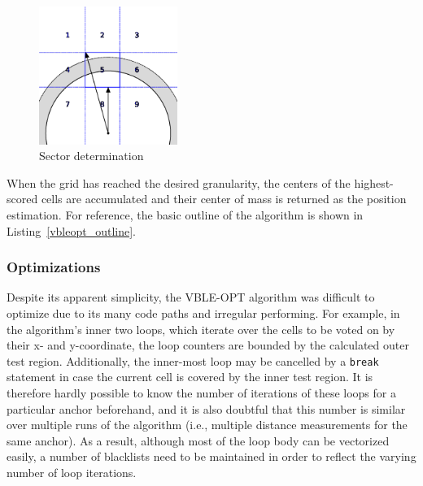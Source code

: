 \begin{figure}
\begin{center}
\includegraphics[width=0.4\textwidth]{img/vble_sector.eps}
\end{center}
\caption{Sector determination}
\label{fig:vble_sector}
\end{figure}

When the grid has reached the desired granularity, the centers of the highest-scored cells are accumulated and their center of mass is returned as the position estimation. For reference, the basic outline of the algorithm is shown in Listing~\ref{vbleopt_outline}.


\subsubsection{Optimizations}
Despite its apparent simplicity, the VBLE-OPT algorithm was difficult to optimize due to its many code paths and irregular performing. For example, in the algorithm's inner two loops, which iterate over the cells to be voted on by their x- and y-coordinate, the loop counters are bounded by the calculated outer test region. Additionally, the inner-most loop may be cancelled by a \texttt{break} statement in case the current cell is covered by the inner test region. It is therefore hardly possible to know the number of iterations of these loops for a particular anchor beforehand, and it is also doubtful that this number is similar over multiple runs of the algorithm (i.e., multiple distance measurements for the same anchor). As a result, although most of the loop body can be vectorized easily, a number of blacklists need to be maintained in order to reflect the varying number of loop iterations.

